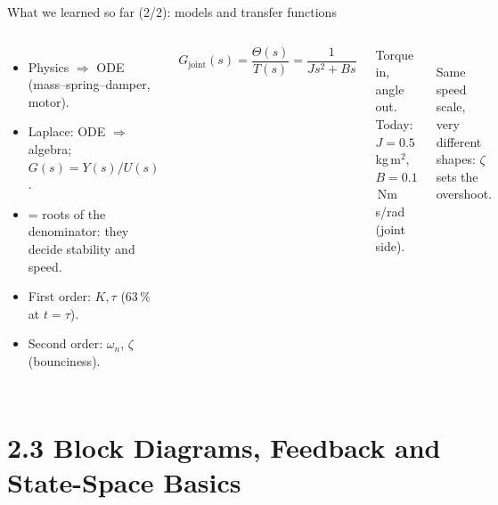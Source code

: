 \documentclass[aspectratio=169,10pt]{beamer}
\begin{document}
\begin{frame}{What we learned so far (2/2): models and transfer functions}
\begin{columns}[T]
\small
\begin{itemize}
  \item Physics $\Rightarrow$ ODE (mass--spring--damper, motor).
  \item Laplace: ODE $\Rightarrow$ algebra; $G(s)=Y(s)/U(s)$.
  \item {} = roots of the denominator: they decide stability and speed.
  \item First order: $K,\tau$ (63\,\% at $t=\tau$).
  \item Second order: $\omega_n$, $\zeta$ (bounciness).
\end{itemize}
\begin{eqbox}
\[
G_{\mathrm{joint}}(s)=\frac{\Theta(s)}{T(s)}=\frac{1}{Js^2+Bs}
\]
\end{eqbox}
\footnotesize Torque in, angle out. Today: $J=0.5$\,kg\,m$^2$, $B=0.1$\,Nm\,s/rad (joint side).
\centering
{}\\
\footnotesize Same speed scale, very different shapes: $\zeta$ sets the overshoot.
\end{columns}
\end{frame}

\section{2.3 Block Diagrams, Feedback and State-Space Basics}
\end{document}
